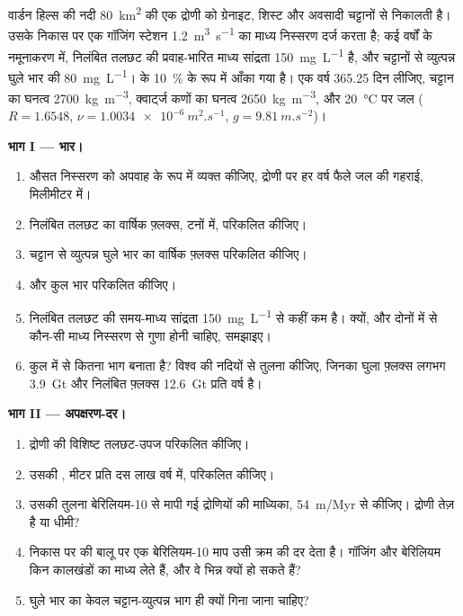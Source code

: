 \begin{problem}
\label{pb:b1:erosion-transport:1}
वार्डन हिल्स की नदी \qty{80}{km^2} की एक द्रोणी को ग्रेनाइट, शिस्ट और अवसादी चट्टानों से निकालती है। उसके निकास पर एक गॉजिंग स्टेशन \qty{1.2}{m^3.s^{-1}} का माध्य निस्सरण दर्ज करता है; कई वर्षों के नमूनाकरण में, निलंबित तलछट की प्रवाह-भारित माध्य सांद्रता \qty{150}{mg.L^{-1}} है, और चट्टानों से व्युत्पन्न घुले भार की \qty{80}{mg.L^{-1}}।   के \qty{10}{\percent} के रूप में आँका गया है। एक वर्ष \num{365.25} दिन लीजिए, चट्टान का घनत्व \qty{2700}{kg.m^{-3}}, क्वार्ट्ज कणों का घनत्व \qty{2650}{kg.m^{-3}}, और \qty{20}{\celsius} पर जल ($R
= 1.6548$, $\nu = \qty{1.0034e-6}{m^2.s^{-1}}$, $g = \qty{9.81}{m.s^{-2}}$)।

\medskip
\noindent\textbf{भाग I --- भार।}
\begin{enumerate}
  \item औसत निस्सरण को अपवाह के रूप में व्यक्त कीजिए, द्रोणी पर हर वर्ष फैले जल की गहराई, मिलीमीटर में।
  \item निलंबित तलछट का वार्षिक फ़्लक्स, टनों में, परिकलित कीजिए।
  \item चट्टान से व्युत्पन्न घुले भार का वार्षिक फ़्लक्स परिकलित कीजिए।
  \item {} और कुल भार परिकलित कीजिए।
  \item निलंबित तलछट की समय-माध्य सांद्रता \qty{150}{mg.L^{-1}} से कहीं कम है। क्यों, और दोनों में से कौन-सी माध्य निस्सरण से गुणा होनी चाहिए, समझाइए।
  \item कुल में से  कितना भाग बनाता है? विश्व की नदियों से तुलना कीजिए, जिनका घुला फ़्लक्स लगभग \qty{3.9}{Gt} और निलंबित फ़्लक्स \qty{12.6}{Gt} प्रति वर्ष है।
\end{enumerate}

\medskip
\noindent\textbf{भाग II --- अपक्षरण-दर।}
\begin{enumerate}[resume]
  \item द्रोणी की विशिष्ट तलछट-उपज परिकलित कीजिए।
  \item उसकी , मीटर प्रति दस लाख वर्ष में, परिकलित कीजिए।
  \item उसकी तुलना बेरिलियम-10 से मापी गई द्रोणियों की माध्यिका, \qty{54}{m/Myr} से कीजिए। द्रोणी तेज़ है या धीमी?
  \item निकास पर की बालू पर एक बेरिलियम-10 माप उसी क्रम की दर देता है। गॉजिंग और बेरिलियम किन कालखंडों का माध्य लेते हैं, और वे भिन्न क्यों हो सकते हैं?
  \item घुले भार का केवल चट्टान-व्युत्पन्न भाग ही क्यों गिना जाना चाहिए?
\end{enumerate}


\end{problem}
